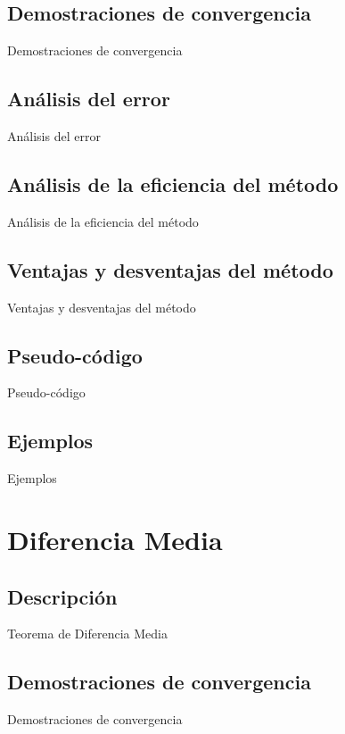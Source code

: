 \documentclass[journal,transmag]{IEEEtran}
\theoremstyle{mytheoremstyle}
\theoremstyle{mytheoremstyle}
\theoremstyle{myproblemstyle}
\begin{document}
\subsection{Demostraciones de convergencia}
\begin{lipsum}
    Demostraciones de convergencia
\end{lipsum}
\subsection{Análisis del error}
\begin{lipsum}
    Análisis del error
\end{lipsum}
\subsection{Análisis de la eficiencia del método}
\begin{lipsum}
    Análisis de la eficiencia del método
\end{lipsum}
\subsection{Ventajas y desventajas del método}
\begin{lipsum}
    Ventajas y desventajas del método
\end{lipsum}
\subsection{Pseudo-código}
\begin{lipsum}
    Pseudo-código
\end{lipsum}
\subsection{Ejemplos}
\begin{lipsum}
    Ejemplos
\end{lipsum}
\section{Diferencia Media}
\subsection{Descripción}
\begin{lipsum}
    Teorema de Diferencia Media
\end{lipsum}
\subsection{Demostraciones de convergencia}
\begin{lipsum}
    Demostraciones de convergencia
\end{lipsum}
\end{document}
